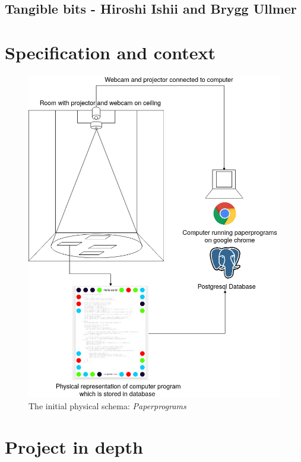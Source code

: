 \documentclass[12pt]{report}
\begin{document}
\section{Tangible bits - Hiroshi Ishii  and  Brygg Ullmer}
\label{sec:orgf681ac6}
\cite{IshiiH2002Tbdt}

\chapter{Specification and context}
\label{sec:orgf827526}

\begin{figure}[htbp]
\centering
\includegraphics[width=15cm]{assets/pp-diag.png}
\caption{The initial physical schema: \emph{Paperprograms} \label{pp-schema}}
\end{figure}


\chapter{Project in depth}
\label{sec:org94cc4a3}
\end{document}
